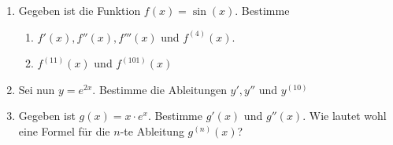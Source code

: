 \begin{ueb}
\begin{enumerate}
		\item Gegeben ist die Funktion $f(x) = \sin(x)$. Bestimme
		      \begin{enumerate}
			      \item $f'(x), f''(x), f'''(x)$ und $f^{(4)}(x)$.
			      \item $f^{(11)}(x)$ und $f^{(101)}(x)$
		      \end{enumerate}

		\item Sei nun $y=e^{2x}$. Bestimme die Ableitungen $y', y''$ und $y^{(10)}$

		\item Gegeben ist $g(x) = x\cdot e^x$. Bestimme $g'(x)$ und $g''(x)$. Wie lautet wohl eine Formel für die $n$-te Ableitung $g^{(n)}(x)$?
	\end{enumerate}

\end{ueb}

